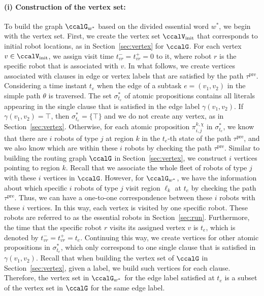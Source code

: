 \documentclass[Afour,sageh,times]{sagej}
\renewcommand{\ap}[3]{\mathcal{\pi}_{{#1},{#2}}^{#3}}
\begin{document}
{\paragraph{(i) Construction of the vertex set:}\label{app:vertex} To build the graph $\ccalG_{w^*}$ based on the divided  essential word  $w^*$, we begin with the vertex set. First, we create the vertex set $\ccalV_{\text{init}}$ that corresponds to initial robot locations, as in Section~\ref{sec:vertex} for $\ccalG$. For each vertex $v \in \ccalV_{\text{init}}$, we assign visit time $t_{vr}^- = t_{vr}^+ = 0$ to it,  where robot $r$ is the specific robot that is associated with $v$. In what follows, we create vertices associated with clauses in edge or vertex labels that are satisfied by the path $\tau^\text{pre}$. Considering a time instant $t_e$ when the edge of a subtask  $e = (v_1, v_2)$ in the simple path $\theta$ is traversed. The set $\sigma_{t_e}^*$ of atomic propositions  contains all literals appearing in the single clause that is satisfied in the edge label $\gamma(v_1, v_2)$. If $\gamma(v_1, v_2) = \top$, then $\sigma_{t_e}^* = \{\top\}$ and we do not create any vertex, as in Section~\ref{sec:vertex}. Otherwise, for each atomic proposition $\ap{i}{j}{k,\chi}$ in $\sigma_{t_e}^*$, we know that there are $i$ robots of type $j$ at region $k$ in the $t_e$-th state of the path $\tau^\text{pre}$, and we also know which are within these $i$ robots by checking the path $\tau^\text{pre}$. Similar to building the routing graph $\ccalG$ in Section~\ref{sec:vertex}, we construct $i$ vertices pointing to region $k$. Recall that we associate the whole fleet of robots of type $j$ with these $i$ vertices in $\ccalG$. However, for $\ccalG_{w^*}$, we have the information about which specific $i$ robots of type $j$ visit region $\ell_k$ at $t_e$ by checking the path $\tau^\text{pre}$. Thus, we can have a one-to-one correspondence between these $i$ robots with these $i$ vertices. In this way, each vertex is visited by one specific robot. These robots are referred to as the essential robots in Section~\ref{sec:run}. Furthermore, the time that the specific  robot $r$ visits its assigned vertex $v$ is $t_e$, which is denoted by $t_{vr}^- = t_{vr}^+ = t_e$. Continuing this way, we create vertices for other atomic propositions in $\sigma_{t_e}^*$, which only correspond to one single clause that is satisfied in $\gamma(v_1, v_2)$. Recall that when building the vertex set of $\ccalG$ in Section~\ref{sec:vertex}, given a label, we build such vertices for each clause. Therefore, the vertex set in $\ccalG_{w^*}$ for the edge label satisfied at $t_e$ is a subset of the vertex set in $\ccalG$ for the same edge label.

}
\end{document}
